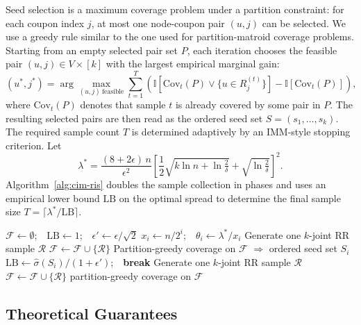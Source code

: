 \documentclass[sigconf]{acmart}
\newcommand{\CIMRIS}{\textsc{CIM-RIS}}
\newcommand{\I}{\mathbb{I}}
\begin{document}
Seed selection is a maximum coverage problem under a partition
constraint: for each coupon index $j$, at most one node-coupon pair
$(u,j)$ can be selected.
We use a greedy rule similar to the one used for partition-matroid
coverage problems.
Starting from an empty selected pair set $P$, each iteration chooses the
feasible pair $(u,j)\in V\times[k]$ with the largest empirical marginal
gain:
\[
  (u^*,j^*) =
  \arg\max_{(u,j)\ \mathrm{feasible}}
    \sum_{t=1}^{T}
    \left(
      \I\!\left[
        \mathrm{Cov}_t(P)\vee\{u\in R_j^{(t)}\}
      \right]
      - \I[\mathrm{Cov}_t(P)]
    \right),
\]
where $\mathrm{Cov}_t(P)$ denotes that sample $t$ is already covered by
some pair in $P$.
The resulting selected pairs are then read as the ordered seed set
$S=(s_1,\ldots,s_k)$.
The required sample count $T$ is determined adaptively by an IMM-style
stopping criterion.
Let
\[
  \lambda^* = \frac{(8+2\epsilon)\,n}{\epsilon^2}
  \left[
    \frac{1}{2}\sqrt{k\ln n + \ln\tfrac{2}{\delta}}
    + \sqrt{\ln\tfrac{2}{\delta}}
  \right]^2.
\]
Algorithm~\ref{alg:cim-ris} doubles the sample collection in phases and
uses an empirical lower bound $\mathrm{LB}$ on the optimal spread to
determine the final sample size $T = \lceil\lambda^*/\mathrm{LB}\rceil$.

\begin{algorithm}[t]
\caption{\CIMRIS{}$(G, k, \epsilon, \delta)$}
\label{alg:cim-ris}
\begin{algorithmic}[1]
\State $\mathcal{F} \gets \emptyset$;\ \
  $\mathrm{LB} \gets 1$;\ \ $\epsilon' \gets \epsilon/\sqrt{2}$
  \State $x_i \gets n/2^i$;\ \ $\theta_i \gets \lambda^*/x_i$
    \State Generate one $k$-joint RR sample $\mathcal{R}$
    \State $\mathcal{F} \gets \mathcal{F} \cup \{\mathcal{R}\}$
  \EndWhile
  \State Partition-greedy coverage on $\mathcal{F}$
    $\Rightarrow$ ordered seed set $S_i$
    \State $\mathrm{LB} \gets \hat{\sigma}(S_i)/(1+\epsilon')$;\ \
      \textbf{break}
  \EndIf
\EndFor
{}
  \State Generate one $k$-joint RR sample $\mathcal{R}$
  \State $\mathcal{F} \gets \mathcal{F} \cup \{\mathcal{R}\}$
\EndWhile
\State \Return partition-greedy coverage on $\mathcal{F}$
\end{algorithmic}
\end{algorithm}

\subsection{Theoretical Guarantees}
\end{document}
